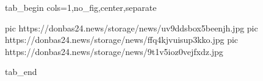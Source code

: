  
 
 
 
 

\ifcmt
  tab_begin cols=1,no_fig,center,separate

     pic https://donbas24.news/storage/news/uv9ddsbox5beenjh.jpg
		 pic https://donbas24.news/storage/news/ffq4kjvuisup3kko.jpg
		 pic https://donbas24.news/storage/news/9t1v5ioz0vejfxdz.jpg

  tab_end
\fi
